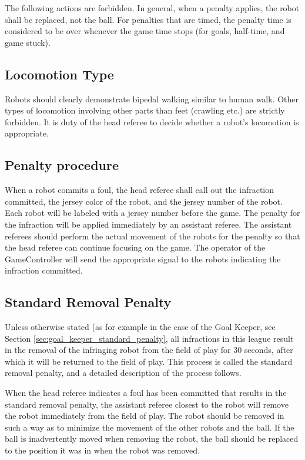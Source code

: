 \documentclass[12pt]{article}
\begin{document}
The following actions are forbidden. In general, when a penalty
applies, the robot shall be replaced, not the ball.  For penalties
that are timed, the penalty time is considered to be over whenever
the game time stops (for goals, half-time, and game stuck).

\subsection{Locomotion Type}
\label{sec:locomotion_type}
Robots should clearly demonstrate bipedal walking similar to human walk. Other types of locomotion involving other parts than feet (crawling etc.) are strictly forbidden. It is duty of the head referee to decide whether a robot's locomotion is appropriate.

\subsection{Penalty procedure}
\label{sec:penalty_procedure}

When a robot commits a foul, the head referee shall call out the
infraction committed, the jersey color of the robot, and the jersey
number of the robot.  Each robot will be labeled with a jersey
number before the game.  The penalty for the infraction will be
applied immediately by an assistant referee.  The assistant referees
should perform the actual movement of the robots for the penalty so
that the head referee can continue focusing on the game.  The
operator of the GameController will send the appropriate signal to
the robots indicating the infraction committed.

\subsection{Standard Removal Penalty}
\label{sec:removal_penalty}

Unless otherwise stated (as for example in the case of the Goal Keeper, see Section \ref{sec:goal_keeper_standard_penalty}, all infractions in this league result in the removal of the
infringing robot from the field of play for 30 seconds, after which it will be returned to the field of play.
This process is called the standard removal penalty, and a detailed description of the process follows.

When the head
referee indicates a foul has been committed that results in the
standard removal penalty, the assistant referee closest to the robot
will remove the robot immediately from the field of play.  The robot
should be removed in such a way as to minimize the movement of the
other robots and the ball.  If the ball is inadvertently moved when
removing the robot, the ball should be replaced to the position it
was in when the robot was removed.
\end{document}
